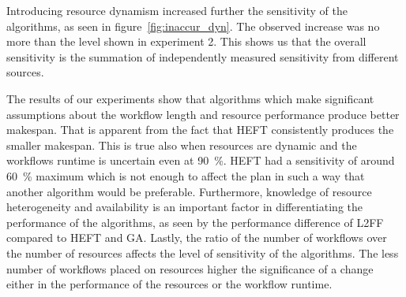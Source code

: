 
Introducing resource dynamism increased further the sensitivity of the algorithms, as seen in figure~\ref{fig:inaccur_dyn}.
The observed increase was no more than the level shown in experiment 2.
This shows us that the overall sensitivity is the summation of independently measured sensitivity from different sources.

The results of our experiments show that algorithms which make significant assumptions about the workflow length and resource performance produce better makespan.
That is apparent from the fact that HEFT consistently produces the smaller makespan.
This is true also when resources are dynamic and the workflows runtime is uncertain even at 90~\%.
HEFT had a sensitivity of around 60~\% maximum which is not enough to affect the plan in such a way that another algorithm would be preferable.
Furthermore, knowledge of resource heterogeneity and availability is an important factor in differentiating the performance of the algorithms, as seen by the performance difference of L2FF compared to HEFT and GA.
Lastly, the ratio of the number of workflows over the number of resources affects the level of sensitivity of the algorithms.
The less number of workflows placed on resources higher the significance of a change either in the performance of the resources or the workflow runtime.
%


